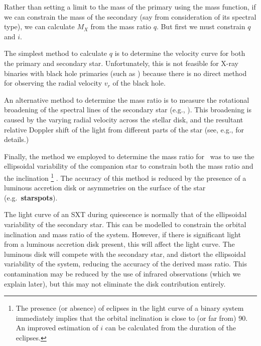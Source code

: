Rather than setting a limit to the mass of the primary using the mass
function, if we can constrain the mass of the secondary (say from
consideration of its spectral type), we can calculate $M_{X}$ from the
mass ratio $q$. But first we must constrain $q$ and $i$. %

\vspace{\myparskip}

The simplest method to calculate $q$ is to determine the velocity
curve for both the primary and secondary star. Unfortunately, this is
not feasible for X-ray binaries with black hole primaries (such as \groj) because there is no direct method for observing the radial velocity $v_r$ of the black hole. %

\vspace{\myparskip}

An alternative method to determine the mass ratio is to measure the rotational broadening of the spectral lines of the secondary star (e.g., %
%
). This broadening is caused by the varying radial velocity across the
stellar disk, and the resultant relative Doppler shift of the light
from different parts of the star (see, e.g., %
for details.) %

\vspace{\myparskip}

Finally, the method we employed to determine the mass ratio for \groj\ was to use the ellipsoidal variability of the companion star to constrain
both the mass ratio and the inclination%
\footnote{\label{cha:Introduction:sec:X-rayBinaries:subsec:DeterminingTheMassOfThePrimary:foot:inc}
The presence (or absence) of eclipses in the light curve of a binary system
immediately implies that the orbital inclination is close to (or far from) 90\degr. An improved estimation of $i$ can be calculated from the
duration of the eclipses. %
}%
. The accuracy of this method is
reduced by the presence of a luminous accretion disk or asymmetries on the surface of the star
(e.g.\ \textbf{starspots}). %

\vspace{\myparskip}

The light curve of an SXT during quiescence is normally that of the ellipsoidal variability of the secondary star. This can be modelled to constrain the orbital inclination and mass ratio of the system. However, if there is significant light from a luminous accretion disk
present, this will affect the light curve. The luminous disk will compete with the secondary star, and distort the ellipsoidal variability of the system, reducing the accuracy of the derived mass ratio. This contamination may be reduced by the use of infrared observations (which we explain later), but this may not eliminate the disk contribution entirely.

